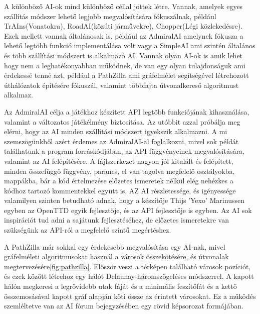 A különböző AI-ok mind különböző céllal jöttek létre. Vannak, amelyek egyes szállítás módszer lehető legjobb megvalósítására fókuszálnak, például TrAIns(Vonatokra), RoadAI(közúti járművekre), Chopper(Légi közlekedésre). Ezek mellett vannak általánosak is, például az AdmiralAI amelynek fókusza a lehető legtöbb funkció implementálása volt vagy a SimpleAI ami szintén általános és több szállítási módszert is alkalmazó AI. Vannak olyan AI-ok is amik lehet hogy nem a leghatékonyabban működnek, de van egy olyan tulajdonságuk ami érdekessé tenné azt, például a PathZilla ami gráfelmélet segítségével létrehozott úthálózatok építésére fókuszál, valamint többfajta útvonalkereső algoritmust alkalmaz.

Az AdmiralAI célja a játékhoz készített API legtöbb funkciójának kihasználása, valamint a változatos játékélmény biztosítása. Az utóbbit azzal próbálja meg elérni, hogy az AI minden szállítási módszert igyekszik alkalmazni. A mi szemszögünkből azért érdemes az AdmiralAI-al foglalkozni, mivel sok példát találhatunk a program forráskódjában, az API függvényeinek megvalósítására, valamint az AI felépítésére. A fájlszerkezet nagyon jól kitalált és felépített, minden összefüggő függvény, parancs, el van tagolva megfelelő osztályokba, mappákba, bár a kód értelmezése előzetes ismeretek nélkül elég nehézkes a kódhoz tartozó kommentekkel együtt is. AZ AI részletessége, és igényessége valamilyen szinten betudható adnak, hogy a készítője Thijs 'Yexo' Marinussen egyben az OpenTTD egyik fejlesztője, és az API fejlesztője is egyben. Az AI sok inspirációt tud adni a sajátunk fejlesztéséhez, de előzetes ismeretekre van szükségünk az API-ról a megfelelő szintű megértéshez.

A PathZilla már sokkal egy érdekesebb megvalósítása egy AI-nak, mivel gráfelméleti algoritmusokat használ a városok összekötésére, és útvonalak megtervezésére\ref{fig:pathzilla}. Először veszi a térképen található városok pozíciót, és ezek között létrehoz egy hálót Delaunay-háromszögeléses módszerrel. A kapott hálón megkeresi a legrövidebb utak fáját és a minimális feszítőfát és a kettő összemosásával kapott gráf alapján köti össze az érintett városokat. Ez a működés szemléltetve van az AI fórum bejegyzésében egy rövid képsorozat formájában.

